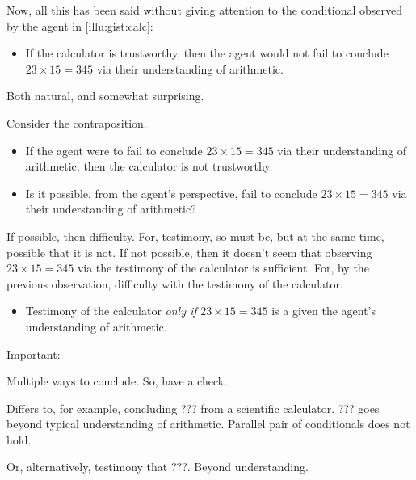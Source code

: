 \begin{note}
  Now, all this has been said without giving attention to the conditional observed by the agent in \autoref{illu:gist:calc}:

  \begin{itemize}
  \item
    If the calculator is trustworthy, then the agent would not fail to conclude \(23 \times 15 = 345\) via their understanding of arithmetic.
  \end{itemize}

  Both natural, and somewhat surprising.

  Consider the contraposition.

  \begin{itemize}
  \item
    If the agent were to fail to conclude \(23 \times 15 = 345\) via their understanding of arithmetic, then the calculator is not trustworthy.
  \end{itemize}

  \begin{itemize}
  \item
    Is it possible, from the agent's perspective, fail to conclude \(23 \times 15 = 345\) via their understanding of arithmetic?
  \end{itemize}

  If possible, then difficulty.
  For, testimony, so must be, but at the same time, possible that it is not.
  If not possible, then it doesn't seem that observing \(23 \times 15 = 345\) via the testimony of the calculator is sufficient.
  For, by the previous observation, difficulty with the testimony of the calculator.

  \begin{itemize}
  \item
    Testimony of the calculator \emph{only if} \(23 \times 15 = 345\) is a  given the agent's understanding of arithmetic.
  \end{itemize}
\end{note}

\begin{note}
  Important:

  Multiple ways to conclude.
  So, have a check.

  Differs to, for example, concluding {\color{red} ???} from a scientific calculator.
  {\color{red} ???} goes beyond typical understanding of arithmetic.
  Parallel pair of conditionals does not hold.

  Or, alternatively, testimony that {\color{red} ???}.
  Beyond understanding.
\end{note}

